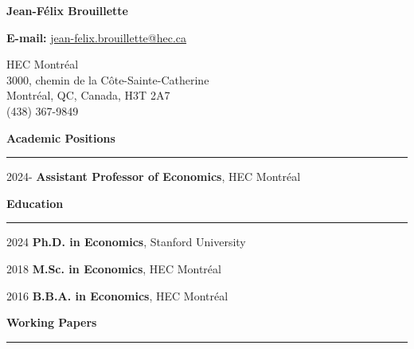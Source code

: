 \documentclass[12pt]{article}
\begin{document}
\begin{center}
{\huge \textbf{Jean-F\'elix Brouillette}} \\

\vspace{0.5cm}

\textbf{E-mail:} \href{mailto:jean-felix.brouillette@hec.ca}{jean-felix.brouillette@hec.ca} \\

\vspace{0.5cm}

\begin{small}
HEC Montr\'eal \\
3000, chemin de la C\^ote-Sainte-Catherine \\
Montr\'eal, QC, Canada, H3T 2A7 \\
(438) 367-9849
\end{small}
\end{center}

{\large \textbf{Academic Positions}} \\
\noindent\rule[0.5\baselineskip]{\textwidth}{1pt}

\begin{small}
2024- \tabto{1.5cm} \textbf{Assistant Professor of Economics}, HEC Montr\'eal
\end{small}

\vspace{0.5cm}

{\large \textbf{Education}} \\
\noindent\rule[0.5\baselineskip]{\textwidth}{1pt}

\begin{small}
2024 \tabto{1.5cm} \textbf{Ph.D. in Economics}, Stanford University

2018 \tabto{1.5cm} \textbf{M.Sc. in Economics}, HEC Montr\'eal

2016 \tabto{1.5cm} \textbf{B.B.A. in Economics}, HEC Montr\'eal
\end{small}

\vspace{0.5cm}

{\large \textbf{Working Papers}} \\
\noindent\rule[0.5\baselineskip]{\textwidth}{1pt}
\end{document}
